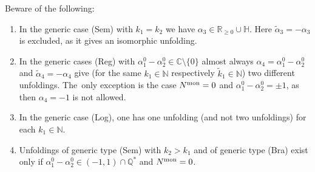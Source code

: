 \documentclass[pdftex]{sigma}%
\numberwithin{equation}{section}
\numberwithin{figure}{section}
\newcommand{\N}{{\mathbb N}}
\newcommand{\Q}{{\mathbb Q}}
\newcommand{\C}{{\mathbb C}}
\newcommand{\R}{{\mathbb R}}
\renewcommand{\H}{{\mathbb H}}
\newcommand{\www}{\widetilde}
\begin{document}
\begin{Remark}%
Beware of the following:

\begin{enumerate}\itemsep=0pt
\item[$(i)$] In the generic case (Sem) with $k_1=k_2$ we have
$\alpha_3\in\R_{\geq 0}\cup\H$. Here $\www\alpha_3=-\alpha_3$
is excluded, as it gives an isomorphic unfolding.

\item[$(ii)$] In the generic cases (Reg) with
$\alpha_1^0-\alpha_2^0\in\C\setminus\{0\}$ almost always
$\alpha_4=\alpha_1^0-\alpha_2^0$ and $\www\alpha_4=-\alpha_4$
give (for the same $k_1\in\N$ respectively $\www k_1\in\N$)
two different unfoldings.
The~only exception is the case $N^{\rm mon}=0$ and
$\alpha_1^0-\alpha_2^0=\pm 1$, as then $\alpha_4=-1$
is not allowed.

\item[$(iii)$] In the generic case (Log), one has
one unfolding (and not two unfoldings) for each $k_1\in\N$.

\item[$(iv)$] Unfoldings of generic type (Sem) with $k_2>k_1$ and of
generic type (Bra) exist only if
$\alpha_1^0-\alpha_2^0\in (-1,1)\cap\Q^*$ and $N^{\rm mon}=0$.
\end{enumerate}
\end{Remark}
\end{document}
